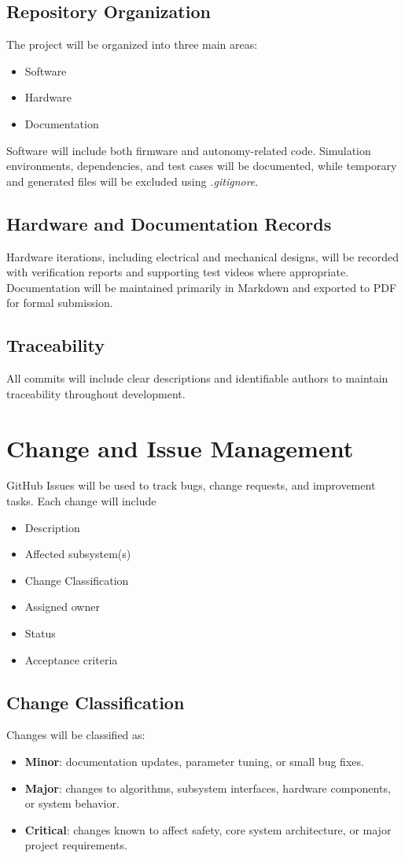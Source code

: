 \documentclass{article}
\begin{document}
\subsection{Repository Organization}
The project will be organized into three main areas:
\begin{itemize}
	\item Software
	\item Hardware
	\item Documentation
\end{itemize}
Software will include both firmware and autonomy-related code. Simulation environments, dependencies, and test cases will be documented, while temporary and generated files will be excluded using \textit{.gitignore}.


\subsection{Hardware and Documentation Records}
Hardware iterations, including electrical and mechanical designs, will be recorded with verification reports and supporting test videos where appropriate.
Documentation will be maintained primarily in Markdown and exported to PDF for formal submission.

\subsection{Traceability}
All commits will include clear descriptions and identifiable authors to maintain traceability throughout development.

\section{Change and Issue Management}
GitHub Issues will be used to track bugs, change requests, and improvement tasks.
Each change will include 
\begin{itemize}
	\item Description
	\item Affected subsystem(s)
	\item Change Classification
	\item Assigned owner
	\item Status
	\item Acceptance criteria
\end{itemize}
\subsection{Change Classification}
Changes will be classified as:
\begin{itemize}
	\item \textbf{Minor}: documentation updates, parameter tuning, or small bug fixes.
	\item \textbf{Major}: changes to algorithms, subsystem interfaces, hardware components, or system behavior.
	\item \textbf{Critical}: changes known to affect safety, core system architecture, or major project requirements.	
\end{itemize}
\end{document}
